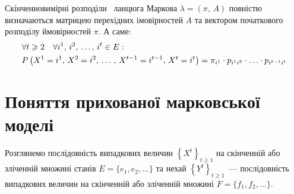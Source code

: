 
Скінченновимірні розподіли~\cite{Norris1997} ланцюга Маркова $\lambda=(\pi,\,A)$ повністю визначаються матрицею перехідних імовірностей $A$ та вектором початкового розподілу ймовірностей $\pi$. А саме:
\begin{align}
    &\forall t\geqslant 2 \quad \forall i^1,\,i^2,\,\ldots,\,i^{t} \in E: \notag \\
    &P\left( X^{1}=i^{1},\,X^{2}=i^{2},\,\ldots\,,\, X^{t-1}=i^{t-1},\, X^{t}=i^{t} \right) = \pi_{i^1} \cdot p_{i^1i^2} \cdot \ldots \cdot p_{i^{t-1}i^{t}} \label{eq: finite-dimensional distributions}
\end{align}

\section{Поняття прихованої марковської моделі}

Розглянемо послідовність випадкових величин $\left\{ X^t \right\}_{t\geqslant 1}$ на скінченній або зліченній множині станів $E=\{e_1,e_2,\ldots\}$ та нехай $\left\{ Y^t \right\}_{t\geqslant 1}$~--- послідовність випадкових величин на скінченній або зліченній множині $F=\{f_1,f_2,\ldots\}$. 

